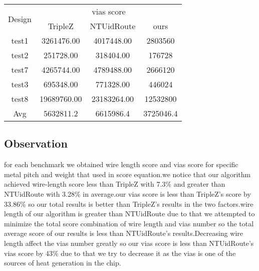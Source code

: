 \documentclass[conference]{IEEEtran}
\begin{document}
\begin{table} [hbt!]
%
\begin{tabular}{|c|c|c|c|}
\hline 
\multirow{2}{*}{{\footnotesize{}Design}} & \multicolumn{3}{c|}{{\footnotesize{}vias score}}\tabularnewline
\cline{2-4} \cline{3-4} \cline{4-4} 
 & {\footnotesize{}TripleZ} & {\footnotesize{}NTUidRoute} & {\footnotesize{}ours}\tabularnewline
\hline 
\hline 
{\footnotesize{}test1} & {\footnotesize{}3261476.00} & {\footnotesize{}4017448.00} & {\footnotesize{}2803560}\tabularnewline
\hline 
{\footnotesize{}test2} & {\footnotesize{}251728.00} & {\footnotesize{}318404.00} & {\footnotesize{}176728}\tabularnewline
\hline 
{\footnotesize{}test7} & {\footnotesize{}4265744.00} & {\footnotesize{}4789488.00} & {\footnotesize{}2666120}\tabularnewline
\hline 
{\footnotesize{}test3} & {\footnotesize{}695348.00} & {\footnotesize{}771328.00} & {\footnotesize{}446024}\tabularnewline
\hline 
{\footnotesize{}test8} & {\footnotesize{}19689760.00} & {\footnotesize{}23183264.00} & {\footnotesize{}12532800}\tabularnewline
\hline 
{\footnotesize{}Avg} & {\footnotesize{}5632811.2} & {\footnotesize{}6615986.4} & {\footnotesize{}3725046.4}\tabularnewline
\hline 
\end{tabular}
\end{table}


\subsection{Observation}

for each benchmark we obtained wire length score and vias score for
specific metal pitch and weight that used in score equation.we notice
that our algorithm achieved wire-length score less than TripleZ with
7.3\% and greater than NTUidRoute with 3.28\% in average.our vias
score is less than TripleZ's score by 33.86\% so our total results
is better than TripleZ's results in the two factors.wire length of
our algorithm is greater than NTUidRoute due to that we attempted
to minimize the total score combination of wire length and vias number
so the total average score of our results is less than NTUidRoute's
results.Decreasing wire length affect the vias number greatly so
our vias score is less than NTUidRoute's vias score by 43\% due to that
we try to decrease it as the vias is one of the sources of heat generation
in the chip.

\end{document}
